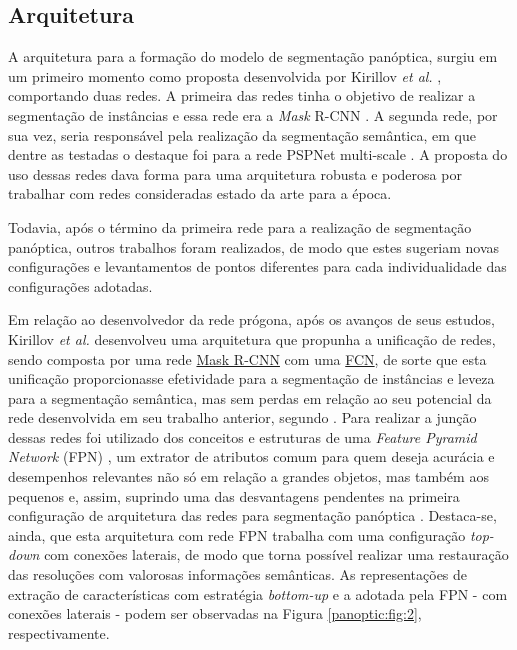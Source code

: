 \subsection{Arquitetura}
\label{panoptic:arch}
A arquitetura para a formação do modelo de segmentação panóptica, surgiu em um primeiro momento como proposta desenvolvida por Kirillov \textit{et al.} \cite{Kirillov2019a}, comportando duas redes. A primeira das redes tinha o objetivo de realizar a segmentação de instâncias e essa rede era a \textit{Mask} R-CNN \cite{He2020}. A segunda rede, por sua vez, seria responsável pela realização da segmentação semântica, em que dentre as testadas o destaque foi para a rede PSPNet multi-scale \cite{Zhao2017}. A proposta do uso dessas redes dava forma para uma arquitetura robusta e poderosa \cite{Kirillov2019a} por trabalhar com redes consideradas estado da arte para a época.

Todavia, após o término da primeira rede para a realização de segmentação panóptica, outros trabalhos foram realizados, de modo que estes sugeriam novas configurações e levantamentos de pontos diferentes para cada individualidade das configurações adotadas.

Em relação ao desenvolvedor da rede prógona, após os avanços de seus estudos, Kirillov \textit{et al.} \cite{Kirillov2019} desenvolveu uma arquitetura que propunha a unificação de redes, sendo composta por uma rede \hyperref[instance:mask]{Mask R-CNN} com uma \hyperref[semantic:FCN]{FCN}, de sorte que esta unificação proporcionasse efetividade para a segmentação de instâncias e leveza para a segmentação semântica, mas sem perdas em relação ao seu potencial da rede desenvolvida em seu trabalho anterior, segundo \cite{Kirillov2019}. Para realizar a junção dessas redes foi utilizado dos conceitos e estruturas de uma \textit{Feature Pyramid Network} (FPN) \cite{Lin2016}, um extrator de atributos comum para quem deseja acurácia e desempenhos relevantes não só em relação a grandes objetos, mas também aos pequenos \cite{Lin2016} e, assim, suprindo uma das desvantagens pendentes na primeira configuração de arquitetura das redes para segmentação panóptica \cite{Kirillov2019, Kirillov2019a}. Destaca-se, ainda, que esta arquitetura com rede FPN trabalha com uma configuração \textit{top-down} com conexões laterais, de modo que torna possível realizar uma restauração das resoluções com valorosas informações semânticas. As representações de extração de características com estratégia \textit{bottom-up} e a adotada pela FPN - com conexões laterais - podem ser observadas na Figura \ref{panoptic:fig:2}, respectivamente.

